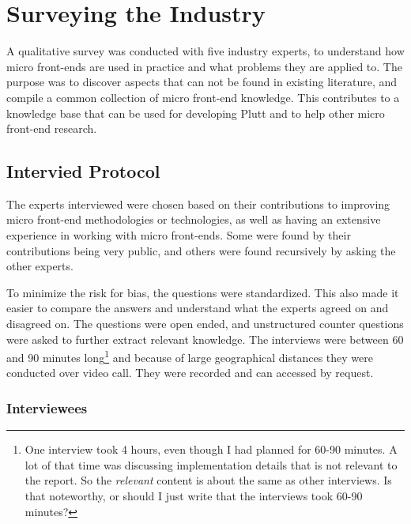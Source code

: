 \chapter{Surveying the Industry}
\label{sec:interviews}

A qualitative survey was conducted with five industry experts, to understand how micro front-ends are used in practice and what problems they are applied to. The purpose was to discover aspects that can not be found in existing literature, and compile a common collection of micro front-end knowledge. This contributes to a knowledge base that can be used for developing Plutt and to help other micro front-end research.

\section{Intervied Protocol}

The experts interviewed were chosen based on their contributions to improving micro front-end methodologies or technologies, as well as having an extensive experience in working with micro front-ends. Some were found by their contributions being very public, and others were found recursively by asking the other experts.

To minimize the risk for bias, the questions were standardized. This also made it easier to compare the answers and understand what the experts agreed on and disagreed on. The questions were open ended, and unstructured counter questions were asked to further extract relevant knowledge. The interviews were between 60 and 90 minutes long\footnote{One interview took 4 hours, even though I had planned for 60-90 minutes. A lot of that time was discussing implementation details that is not relevant to the report. So the \textit{relevant} content is about the same as other interviews. Is that noteworthy, or should I just write that the interviews took 60-90 minutes?} and because of large geographical distances they were conducted over video call. They were recorded and can accessed by request.

\subsection{Interviewees}

